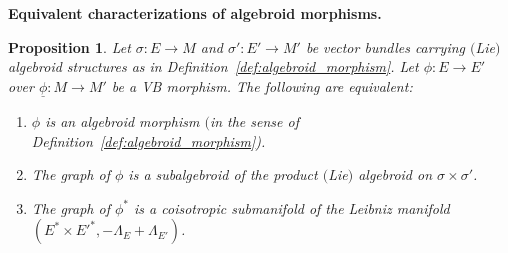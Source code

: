 \documentclass[pdftex]{sigma}
\newcommand{\und}{\underline}
\newcommand{\ra}{\rightarrow}
\numberwithin{equation}{section}
\newtheorem{prop}[thm]{Proposition}
\theoremstyle{definition}
\begin{document}
{\bf Equivalent characterizations of algebroid morphisms.}
\begin{prop}\label{prop:alg_morphism_eqv} Let $\sigma\colon E\ra M$ and $\sigma'\colon E'\ra M'$ be vector bundles carrying $($Lie$)$ algebroid structures as in Definition~{\rm \ref{def:algebroid_morphism}}. Let
 $\phi\colon E\ra E'$ over $\und{\phi}\colon M\ra M'$ be a VB morphism. The following are equivalent:
\begin{enumerate}[$(i)$]\itemsep=0pt
\item \label{cond:alg_morph_Mac} $\phi$ is an algebroid morphism $($in the sense of Definition~{\rm \ref{def:algebroid_morphism})}.
\item \label{cond:alg_morph_graph} The graph of $\phi$ is a subalgebroid of the product $($Lie$)$ algebroid on $\sigma\times \sigma'$.
\item \label{cond:alg_morph_Leibniz} The graph of $\phi^\ast$ is a coisotropic submanifold of the Leibniz manifold~{\rm \cite{JG_PU_Algebroids_1999}} $(E^\ast\times {E'}^\ast, -\Lambda_E + \Lambda_{E'})$.
\end{enumerate}
\end{prop}
\end{document}
